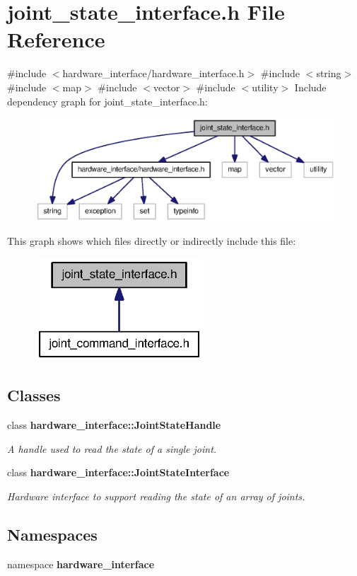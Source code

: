 \section{joint\-\_\-state\-\_\-interface.\-h \-File \-Reference}
\label{joint__state__interface_8h}
{\ttfamily \#include $<$hardware\-\_\-interface/hardware\-\_\-interface.\-h$>$}\*
{\ttfamily \#include $<$string$>$}\*
{\ttfamily \#include $<$map$>$}\*
{\ttfamily \#include $<$vector$>$}\*
{\ttfamily \#include $<$utility$>$}\*
\-Include dependency graph for joint\-\_\-state\-\_\-interface.\-h\-:
\nopagebreak
\begin{figure}[H]
\begin{center}
\leavevmode
\includegraphics[width=350pt]{joint__state__interface_8h__incl}
\end{center}
\end{figure}
\-This graph shows which files directly or indirectly include this file\-:
\nopagebreak
\begin{figure}[H]
\begin{center}
\leavevmode
\includegraphics[width=178pt]{joint__state__interface_8h__dep__incl}
\end{center}
\end{figure}
\subsection*{\-Classes}
\begin{DoxyCompactItemize}
\item 
class {\bf hardware\-\_\-interface\-::\-Joint\-State\-Handle}
\begin{DoxyCompactList}\small\item\em \-A handle used to read the state of a single joint. \end{DoxyCompactList}\item 
class {\bf hardware\-\_\-interface\-::\-Joint\-State\-Interface}
\begin{DoxyCompactList}\small\item\em \-Hardware interface to support reading the state of an array of joints. \end{DoxyCompactList}\end{DoxyCompactItemize}
\subsection*{\-Namespaces}
\begin{DoxyCompactItemize}
\item 
namespace {\bf hardware\-\_\-interface}
\end{DoxyCompactItemize}
